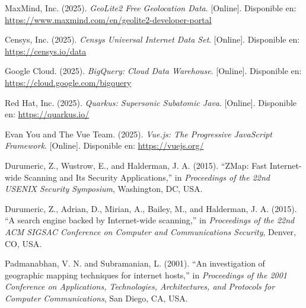 \begin{thebibliography}{10}

MaxMind, Inc. (2025). \textit{GeoLite2 Free Geolocation Data}. [Online]. Disponible en: \url{https://www.maxmind.com/en/geolite2-developer-portal}

Censys, Inc. (2025). \textit{Censys Universal Internet Data Set}. [Online]. Disponible en: \url{https://censys.io/data}

Google Cloud. (2025). \textit{BigQuery: Cloud Data Warehouse}. [Online]. Disponible en: \url{https://cloud.google.com/bigquery}

Red Hat, Inc. (2025). \textit{Quarkus: Supersonic Subatomic Java}. [Online]. Disponible en: \url{https://quarkus.io/}

Evan You and The Vue Team. (2025). \textit{Vue.js: The Progressive JavaScript Framework}. [Online]. Disponible en: \url{https://vuejs.org/}

Durumeric, Z., Wustrow, E., and Halderman, J. A. (2015). ``ZMap: Fast Internet-wide Scanning and Its Security Applications,'' in \textit{Proceedings of the 22nd USENIX Security Symposium}, Washington, DC, USA.

Durumeric, Z., Adrian, D., Mirian, A., Bailey, M., and Halderman, J. A. (2015). ``A search engine backed by Internet-wide scanning,'' in \textit{Proceedings of the 22nd ACM SIGSAC Conference on Computer and Communications Security}, Denver, CO, USA.

Padmanabhan, V. N. and Subramanian, L. (2001). ``An investigation of geographic mapping techniques for internet hosts,'' in \textit{Proceedings of the 2001 Conference on Applications, Technologies, Architectures, and Protocols for Computer Communications}, San Diego, CA, USA.

\end{thebibliography}
